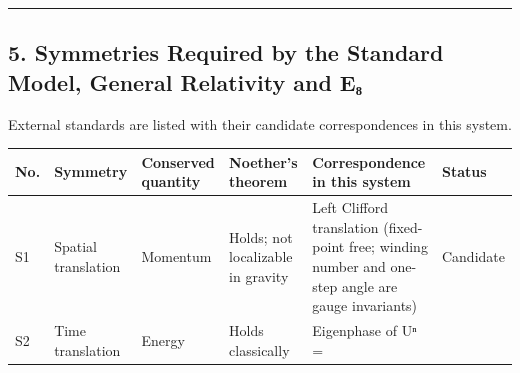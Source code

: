 \documentclass[
  a4paper,
]{article}
\newcounter{none} %
\begin{document}
\begin{center}\rule{0.5\linewidth}{0.5pt}\end{center}

\subsection{5. Symmetries Required by the Standard Model, General
Relativity and
E₈}\label{symmetries-required-by-the-standard-model-general-relativity-and-eux2088}

External standards are listed with their candidate correspondences in
this system.

{\def\LTcaptype{none} %
\begin{longtable}[]{@{}
  >{\raggedright\arraybackslash}p{}
  >{\raggedright\arraybackslash}p{}
  >{\raggedright\arraybackslash}p{}
  >{\raggedright\arraybackslash}p{}
  >{\raggedright\arraybackslash}p{}
  >{\raggedright\arraybackslash}p{}@{}}
\toprule\noalign{}
\begin{minipage}[b]{\linewidth}\raggedright
No.
\end{minipage} & \begin{minipage}[b]{\linewidth}\raggedright
Symmetry
\end{minipage} & \begin{minipage}[b]{\linewidth}\raggedright
Conserved quantity
\end{minipage} & \begin{minipage}[b]{\linewidth}\raggedright
Noether's theorem
\end{minipage} & \begin{minipage}[b]{\linewidth}\raggedright
Correspondence in this system
\end{minipage} & \begin{minipage}[b]{\linewidth}\raggedright
Status
\end{minipage} \\
\midrule\noalign{}
\endhead
\bottomrule\noalign{}
\endlastfoot
S1 & Spatial translation & Momentum & Holds; not localizable in gravity
& Left Clifford translation (fixed-point free; winding number and
one-step angle are gauge invariants) & Candidate \\
S2 & Time translation & Energy & Holds classically & Eigenphase of Uⁿ =

\end{longtable}}
\end{document}
